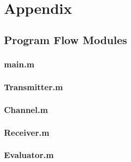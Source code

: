 \chapter*{Appendix}

\section{Program Flow Modules}
\subsection{main.m}
\begin{spacing}{1}
	\small
	
\end{spacing}

\subsection{Transmitter.m}
\begin{spacing}{1}
	\small
	
\end{spacing}

\subsection{Channel.m}
\begin{spacing}{1}
	\small
	
\end{spacing}

\subsection{Receiver.m}
\begin{spacing}{1}
	\small
	
\end{spacing}

\subsection{Evaluator.m}
\begin{spacing}{1}
	\small
	
\end{spacing}
